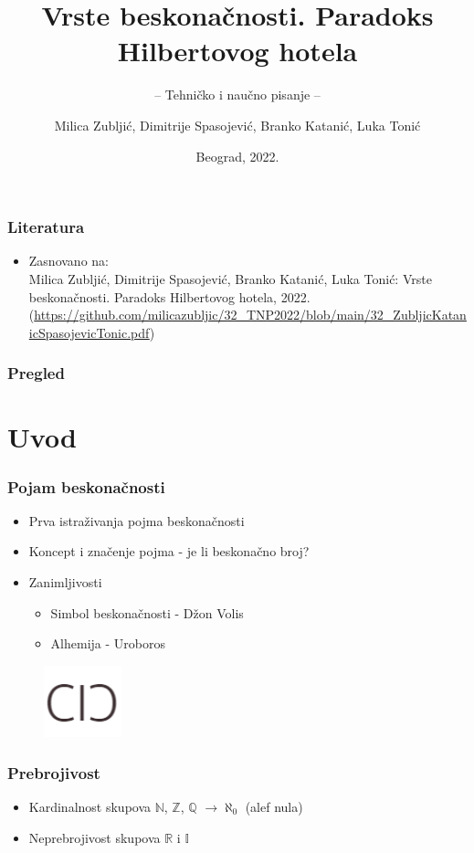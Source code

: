 \documentclass{beamer}
\title{Vrste beskonačnosti. Paradoks Hilbertovog hotela}
\subtitle{-- Tehničko i naučno pisanje --}
\author{Milica Zubljić, Dimitrije Spasojević, Branko Katanić, Luka Tonić}
\institute{Matematički fakultet\\Univerzitet u Beogradu}
\date{
	\footnotesize{Beograd, 2022.}	
}
\begin{document}
\begin{frame}
	\thispagestyle{empty}
	\titlepage
\end{frame}
\addtocounter{framenumber}{-1}
\begin{frame}[fragile]\frametitle{Literatura}
	\begin{itemize}
		\item Zasnovano na:\\

  Milica Zubljić, Dimitrije Spasojević, Branko Katanić, Luka Tonić: Vrste beskonačnosti. Paradoks Hilbertovog hotela, 2022.\\
		(\url{https://github.com/milicazubljic/32_TNP2022/blob/main/32_ZubljicKatanicSpasojevicTonic.pdf})

  \end{itemize}
\end{frame}

\begin{frame}
	\frametitle{Pregled} 
	\tableofcontents[hidesubsections] 
\end{frame}
\section{Uvod}
\begin{frame}
    \frametitle{Pojam beskonačnosti}
    \begin{itemize}
        \item Prva istraživanja pojma beskonačnosti
        \item Koncept i značenje pojma - je li beskonačno broj?
        \item Zanimljivosti
        \begin{itemize}
            \item Simbol beskonačnosti - Džon Volis
            \item Alhemija - Uroboros
        \end{itemize}
    \end{itemize}

    \begin{figure}[h!]
      \centering  \includegraphics[width=0.2\textwidth]{simbol.png}
      \end{figure}
      
\end{frame}
\begin{frame}
    \frametitle{Prebrojivost}
    \begin{itemize}
        \item Kardinalnost skupova $\mathbb{N}$, $\mathbb{Z}$, $\mathbb{Q}$ $\rightarrow \aleph_{0}$ (alef nula)
        \item Neprebrojivost skupova $\mathbb{R}$ i $\mathbb{I}$
    \end{itemize}
\end{frame}
\end{document}
